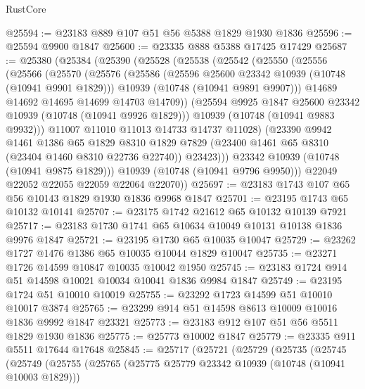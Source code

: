 \begin{lexlean}{RustCore}
\begin{coremodule}
@25594 := @23183 @889 @107 @51 @56 @5388 @1829 @1930 @1836
@25596 := @25594 @9900 @1847
@25600 := @23335 @888 @5388 @17425 @17429
@25687 := @25380
    (@25384
      (@25390
        (@25528
          (@25538
            (@25542
              (@25550
                (@25556
                  (@25566
                    (@25570
                      (@25576
                        (@25586
                          (@25596 @25600 @23342 @10939 (@10748 (@10941 @9901 @1829)))
                          @10939
                          (@10748 (@10941 @9891 @9907)))
                        @14689
                        @14692
                        @14695
                        @14699
                        @14703
                        @14709))
                    (@25594 @9925 @1847 @25600 @23342 @10939 (@10748 (@10941 @9926 @1829)))
                    @10939
                    (@10748 (@10941 @9883 @9932)))
                  @11007
                  @11010
                  @11013
                  @14733
                  @14737
                  @11028)
                (@23390
                  @9942
                  @1461
                  @1386
                  @65
                  @1829
                  @8310
                  @1829
                  @7829
                  (@23400 @1461 @65 @8310 (@23404 @1460 @8310 @22736 @22740))
                  @23423)))
            @23342
            @10939
            (@10748 (@10941 @9875 @1829)))
          @10939
          (@10748 (@10941 @9796 @9950)))
        @22049
        @22052
        @22055
        @22059
        @22064
        @22070))
@25697 := @23183 @1743 @107 @65 @56 @10143 @1829 @1930 @1836 @9968 @1847
@25701 := @23195 @1743 @65 @10132 @10141
@25707 := @23175 @1742 @21612 @65 @10132 @10139 @7921
@25717 := @23183 @1730 @1741 @65 @10634 @10049 @10131 @10138 @1836 @9976 @1847
@25721 := @23195 @1730 @65 @10035 @10047
@25729 := @23262 @1727 @1476 @1386 @65 @10035 @10044 @1829 @10047
@25735 := @23271 @1726 @14599 @10847 @10035 @10042 @1950
@25745 := @23183 @1724 @914 @51 @14598 @10021 @10034 @10041 @1836 @9984 @1847
@25749 := @23195 @1724 @51 @10010 @10019
@25755 := @23292 @1723 @14599 @51 @10010 @10017 @3874
@25765 := @23299 @914 @51 @14598 @8613 @10009 @10016 @1836 @9992 @1847 @23321
@25773 := @23183 @912 @107 @51 @56 @5511 @1829 @1930 @1836
@25775 := @25773 @10002 @1847
@25779 := @23335 @911 @5511 @17644 @17648
@25845 := @25717
    (@25721
      (@25729
        (@25735
          (@25745
            (@25749
              (@25755
                (@25765
                  (@25775 @25779 @23342 @10939 (@10748 (@10941 @10003 @1829)))

\end{coremodule}
\end{lexlean}
